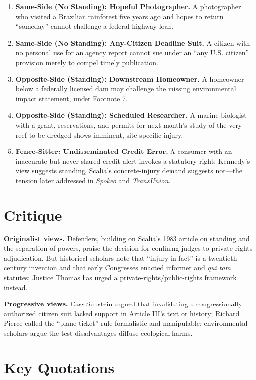 \documentclass[12pt]{article}
\begin{document}
\begin{enumerate}
\item \textbf{Same-Side (No Standing): Hopeful Photographer.} A photographer who visited a Brazilian rainforest five years ago and hopes to return ``someday'' cannot challenge a federal highway loan.
\item \textbf{Same-Side (No Standing): Any-Citizen Deadline Suit.} A citizen with no personal use for an agency report cannot sue under an ``any U.S. citizen'' provision merely to compel timely publication.
\item \textbf{Opposite-Side (Standing): Downstream Homeowner.} A homeowner below a federally licensed dam may challenge the missing environmental impact statement, under Footnote 7.
\item \textbf{Opposite-Side (Standing): Scheduled Researcher.} A marine biologist with a grant, reservations, and permits for next month's study of the very reef to be dredged shows imminent, site-specific injury.
\item \textbf{Fence-Sitter: Undisseminated Credit Error.} A consumer with an inaccurate but never-shared credit alert invokes a statutory right; Kennedy's view suggests standing, Scalia's concrete-injury demand suggests not---the tension later addressed in \textit{Spokeo} and \textit{TransUnion}.
\end{enumerate}

\section{Critique}

\textbf{Originalist views.} Defenders, building on Scalia's 1983 article on standing and the separation of powers, praise the decision for confining judges to private-rights adjudication. But historical scholars note that ``injury in fact'' is a twentieth-century invention and that early Congresses enacted informer and \textit{qui tam} statutes; Justice Thomas has urged a private-rights/public-rights framework instead.

\textbf{Progressive views.} Cass Sunstein argued that invalidating a congressionally authorized citizen suit lacked support in Article III's text or history; Richard Pierce called the ``plane ticket'' rule formalistic and manipulable; environmental scholars argue the test disadvantages diffuse ecological harms.

\section{Key Quotations}
\end{document}
